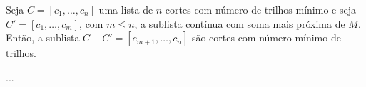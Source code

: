 \begin{theorem}
    Seja $C = [c_1, \ldots, c_n]$ uma lista de $n$ cortes com número de trilhos mínimo e seja $C' = [c_1, \ldots, c_m]$, com $m \leq n$, a sublista contínua com soma mais próxima de $M$. Então, a sublista $C - C' = [c_{m + 1}, \ldots, c_n]$ são cortes com número mínimo de trilhos.
\end{theorem}

\begin{theorem}
    ...
\end{theorem}
